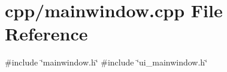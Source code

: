 \section{cpp/mainwindow.cpp File Reference}
\label{mainwindow_8cpp}
{\ttfamily \#include \char`\"{}mainwindow.\+h\char`\"{}}\newline
{\ttfamily \#include \char`\"{}ui\+\_\+mainwindow.\+h\char`\"{}}\newline

